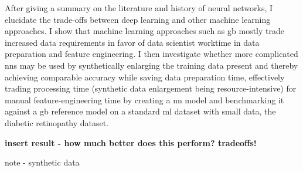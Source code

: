 
After giving a summary on the literature and history of neural networks, I elucidate the trade-offs between deep learning and other machine learning approaches. I show that machine learning approaches such as \ac{gb} mostly trade increased data requirements in favor of data scientist worktime in data preparation and feature engineering.
I then investigate whether more complicated \acp{nn} may be used by synthetically enlarging the training data present and thereby achieving comparable accuracy while saving data preparation time, effectively trading processing time (synthetic data enlargement being resource-intensive) for manual feature-engineering time by creating a \ac{nn} model and benchmarking it against a \ac{gb} reference model on a standard \ac{ml} dataset with small data, the diabetic retinopathy dataset.

\textbf{insert result - how much better does this perform? tradeoffs!}

note - synthetic data \cite{10.1145/3339252.3339281}

